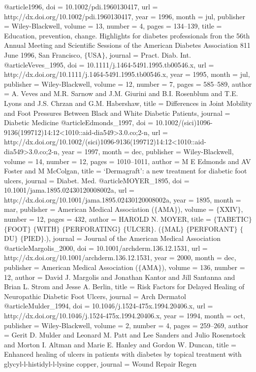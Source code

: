 @article{1996,
	doi = {10.1002/pdi.1960130417},
	url = {http://dx.doi.org/10.1002/pdi.1960130417},
	year = 1996,
	month = {jul},
	publisher = {Wiley-Blackwell},
	volume = {13},
	number = {4},
	pages = {134--139},
	title = {Education, prevention, change. Highlights for diabetes professionals fron the 56th Annual Meeting and Scientific Sessions of the American Diabetes Association 8{\textendash}11 June 1996, San Francisco, $\lbrace$USA$\rbrace$},
	journal = {Pract. Diab. Int.}
}
@article{Veves_1995,
	doi = {10.1111/j.1464-5491.1995.tb00546.x},
	url = {http://dx.doi.org/10.1111/j.1464-5491.1995.tb00546.x},
	year = 1995,
	month = {jul},
	publisher = {Wiley-Blackwell},
	volume = {12},
	number = {7},
	pages = {585--589},
	author = {A. Veves and M.R. Sarnow and J.M. Giurini and B.I. Rosenblum and T.E. Lyons and J.S. Chrzan and G.M. Habershaw},
	title = {Differences in Joint Mobility and Foot Pressures Between Black and White Diabetic Patients},
	journal = {Diabetic Medicine}
}
@article{Edmonds_1997,
	doi = {10.1002/(sici)1096-9136(199712)14:12<1010::aid-dia549>3.0.co;2-n},
	url = {http://dx.doi.org/10.1002/(sici)1096-9136(199712)14:12<1010::aid-dia549>3.0.co;2-n},
	year = 1997,
	month = {dec},
	publisher = {Wiley-Blackwell},
	volume = {14},
	number = {12},
	pages = {1010--1011},
	author = {M E Edmonds and AV Foster and M McColgan},
	title = {`Dermagraft': a new treatment for diabetic foot ulcers},
	journal = {Diabet. Med.}
}
@article{MOYER_1895,
	doi = {10.1001/jama.1895.02430120008002a},
	url = {http://dx.doi.org/10.1001/jama.1895.02430120008002a},
	year = 1895,
	month = {mar},
	publisher = {American Medical Association ($\lbrace$AMA$\rbrace$)},
	volume = {$\lbrace$XXIV$\rbrace$},
	number = {12},
	pages = {432},
	author = {HAROLD N. MOYER},
	title = {$\lbrace$TABETIC$\rbrace$ $\lbrace$FOOT$\rbrace$ $\lbrace$WITH$\rbrace$ $\lbrace$PERFORATING$\rbrace$ $\lbrace$ULCER$\rbrace$. ($\lbrace$MAL$\rbrace$ $\lbrace$PERFORANT$\rbrace$ $\lbrace$DU$\rbrace$ $\lbrace$PIED$\rbrace$.)},
	journal = {Journal of the American Medical Association}
}
@article{Margolis_2000,
	doi = {10.1001/archderm.136.12.1531},
	url = {http://dx.doi.org/10.1001/archderm.136.12.1531},
	year = 2000,
	month = {dec},
	publisher = {American Medical Association ($\lbrace$AMA$\rbrace$)},
	volume = {136},
	number = {12},
	author = {David J. Margolis and Jonathan Kantor and Jill Santanna and Brian L. Strom and Jesse A. Berlin},
	title = {Risk Factors for Delayed Healing of Neuropathic Diabetic Foot Ulcers},
	journal = {Arch Dermatol}
}
@article{Mulder_1994,
	doi = {10.1046/j.1524-475x.1994.20406.x},
	url = {http://dx.doi.org/10.1046/j.1524-475x.1994.20406.x},
	year = 1994,
	month = {oct},
	publisher = {Wiley-Blackwell},
	volume = {2},
	number = {4},
	pages = {259--269},
	author = {Gerit D. Mulder and Leonard M. Patt and Lee Sanders and Julio Rosenstock and Morton I. Altman and Marie E. Hanley and Gordon W. Duncan},
	title = {Enhanced healing of ulcers in patients with diabetes by topical treatment with glycyl-l-histidyl-l-lysine copper},
	journal = {Wound Repair Regen}
}
